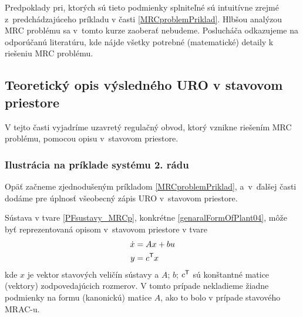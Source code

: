 \documentclass[a4paper, 10pt, ]{article}
\begin{document}
Predpoklady pri, ktorých sú tieto podmienky splniteľné sú intuitívne zrejmé z~predchádzajúceho príkladu v časti \ref{MRCproblemPriklad}. Hlbšou analýzou MRC problému sa v~tomto kurze zaoberať nebudeme. Poslucháča odkazujeme na odporúčanú literatúru, kde nájde všetky potrebné (matematické) detaily k riešeniu MRC problému.

































\subsection{Teoretický opis výsledného URO v stavovom priestore}




V tejto časti vyjadríme uzavretý regulačný obvod, ktorý vznikne riešením MRC problému, pomocou opisu v~stavovom priestore.



\subsubsection{Ilustrácia na príklade systému 2. rádu}

Opäť začneme zjednodušeným príkladom \ref{MRCproblemPriklad}, a~v~ďalšej časti dodáme pre úplnosť všeobecný zápis URO v~stavovom priestore.

Sústava v tvare \eqref{PFsustavy_MRCp}, konkrétne \eqref{genaralFormOfPlant04}, môže byť reprezentovaná opisom v~stavovom priestore v tvare
\begin{subequations}
	\begin{align}
		 \dot x &= A x + b u \\
		 y &= c^{\mathsf{T}} x
	\end{align}
\end{subequations}
kde $x$ je vektor stavových veličín sústavy a $A$; $b$; $c^{\mathsf{T}}$ sú konštantné matice (vektory) zodpovedajúcich rozmerov. V tomto prípade nekladieme žiadne podmienky na formu (kanonickú) matice $A$, ako to bolo v prípade stavového MRAC-u.
\end{document}
